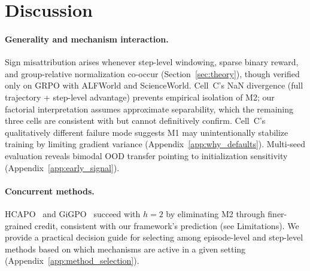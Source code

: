 \section{Discussion}
\label{sec:discussion}

\paragraph{Generality and mechanism interaction.}
Sign misattribution arises whenever step-level windowing, sparse binary reward, and group-relative normalization co-occur (Section~\ref{sec:theory}), though verified only on GRPO with ALFWorld and ScienceWorld. Cell~C's NaN divergence (full trajectory + step-level advantage) prevents empirical isolation of M2; our factorial interpretation assumes approximate separability, which the remaining three cells are consistent with but cannot definitively confirm. Cell~C's qualitatively different failure mode suggests M1 may unintentionally stabilize training by limiting gradient variance (Appendix~\ref{app:why_defaults}). Multi-seed evaluation reveals bimodal OOD transfer pointing to initialization sensitivity (Appendix~\ref{app:early_signal}).

\paragraph{Concurrent methods.}
HCAPO~\citep{hcapo2026} and GiGPO~\citep{feng2025gigpo} succeed with $h{=}2$ by eliminating M2 through finer-grained credit, consistent with our framework's prediction (see Limitations). We provide a practical decision guide for selecting among episode-level and step-level methods based on which mechanisms are active in a given setting (Appendix~\ref{app:method_selection}).

